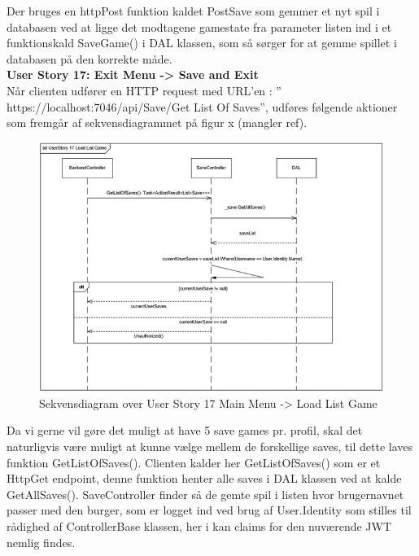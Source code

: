 Der bruges en httpPost funktion kaldet PostSave som gemmer et nyt spil i databasen ved at ligge det modtagene gamestate fra parameter listen ind i et funktionskald SaveGame() i DAL klassen, som så sørger for at gemme spillet i databasen på den korrekte måde.\\

\textbf{User Story 17: Exit Menu -> Save and Exit}\\

Når clienten udfører en HTTP request med URL’en : ” https://localhost:7046/api/Save/Get List Of Saves”, udføres følgende aktioner som fremgår af sekvensdiagrammet på figur x (mangler ref).\\

\begin{figure}[h]
\centering
\includegraphics[width = \textwidth]{02-Body/Images/Backend_sekvens_17.PNG}
\caption{Sekvensdiagram over User Story 17 Main Menu -> Load List Game}
\label{fig:Arkitektur-Backend-Sekvens-17}
\end{figure}

Da vi gerne vil gøre det muligt at have 5 save games pr. profil, skal det naturligvis være muligt at kunne vælge mellem de forskellige saves, til dette laves funktion GetListOfSaves(). Clienten kalder her GetListOfSaves() som er et HttpGet endpoint, denne funktion henter alle saves i DAL klassen ved at kalde GetAllSaves(). SaveController finder så de gemte spil i listen hvor brugernavnet passer med den burger, som er logget ind ved brug af User.Identity som stilles til rådighed af ControllerBase klassen, her i kan claims for den nuværende JWT nemlig findes.\\

